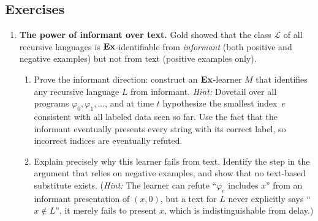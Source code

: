 
\subsection*{Exercises}

\begin{enumerate}[leftmargin=*,itemsep=6pt]

\item \textbf{The power of informant over text.}
  Gold showed that the class $\mathcal{L}$ of all recursive languages
  is $\mathbf{Ex}$-identifiable from \emph{informant} (both positive and
  negative examples) but not from text (positive examples only).
  \begin{enumerate}[label=(\alph*)]
  \item Prove the informant direction: construct an $\mathbf{Ex}$-learner $M$
    that identifies any recursive language $L$ from informant.
    \emph{Hint:}  Dovetail over all programs $\varphi_0, \varphi_1,
    \ldots$, and at time $t$ hypothesize the smallest index~$e$
    consistent with all labeled data seen so far.  Use the fact that
    the informant eventually presents every string with its correct
    label, so incorrect indices are eventually refuted.
  \item Explain precisely why this learner fails from text.  Identify
    the step in the argument that relies on negative examples, and
    show that no text-based substitute exists.  (\emph{Hint:} The
    learner can refute ``$\varphi_e$ includes $x$'' from an
    informant presentation of $(x, 0)$, but a text for $L$ never
    explicitly says ``$x \notin L$'', it merely fails to present
    $x$, which is indistinguishable from delay.)
  \end{enumerate}


\end{enumerate}
